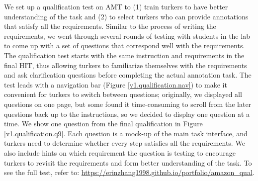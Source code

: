 We set up a qualification test on AMT to (1) train turkers to have better understanding of the task and (2) to select turkers who can provide annotations that satisfy all the requirements. 
Similar to the process of writing the requirements, we went through several rounds of testing with students in the lab to come up with a set of questions that correspond well with the requirements. 
The qualification test starts with the same instruction and requirements in the final HIT, thus allowing turkers to familiarize themselves with the requirements and ask clarification questions before completing the actual annotation task. 
The test leads with a navigation bar (Figure \ref{v1.qualification.nav}) to make it convenient for turkers to switch between questions; originally, we displayed all questions on one page, but some found it time-consuming to scroll from the later questions back up to the instructions, so we decided to display one question at a time. 
We show one question from the final qualification in Figure \ref{v1.qualification.q9}. 
Each question is a mock-up of the main task interface, and turkers need to determine whether every step satisfies all the requirements.
We also include hints on which requirement the question is testing to encourage turkers to revisit the requirements and form better understanding of the task.  
To see the full test, refer to: \url{https://erinzhang1998.github.io/portfolio/amazon_qual}.

